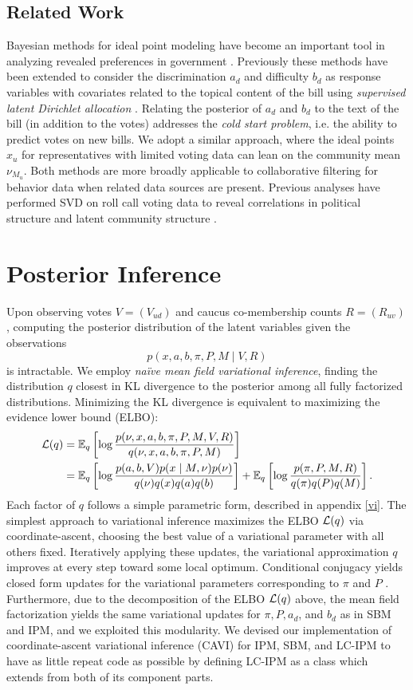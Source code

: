\documentclass{article}
\begin{document}
\subsection{Related Work}

Bayesian methods for ideal point modeling have become an important tool in analyzing revealed preferences in government \cite{Clinton2004}. Previously these methods have been extended to consider the discrimination $a_d$ and difficulty $b_d$ as response variables with covariates related to the topical content of the bill using {\sl supervised latent Dirichlet allocation} \cite{Gerrish2011}. Relating the posterior of $a_d$ and $b_d$ to the text of the bill (in addition to the votes) addresses the {\sl cold start problem}, i.e. the ability to predict votes on new bills. We adopt a similar approach, where the ideal points $x_u$ for representatives with limited voting data can lean on the community mean $\nu_{M_u}$. Both methods are more broadly applicable to collaborative filtering for behavior data when related data sources are present. Previous analyses have performed SVD on roll call voting data to reveal correlations in political structure and latent community structure \cite{Porter2007}.

\section{Posterior Inference}
\label{inference}

Upon observing votes $V = (V_{ud})$ and caucus co-membership counts $R = (R_{uv})$, computing the posterior distribution of the latent variables given the observations
$$
p(x, a, b, \pi, P, M \mid V, R)
$$
 is intractable. We employ {\sl na\"ive mean field variational inference}, finding the distribution $q$ closest in KL divergence to the posterior among all fully factorized distributions. Minimizing the KL divergence is equivalent to maximizing the evidence lower bound (ELBO):
\begin{align*}
\mathcal{L}(q)
&= \mathbb{E}_q\left[\log \frac{p(\nu, x, a, b, \pi, P, M, V, R)}{q(\nu, x, a, b, \pi, P, M)}\right] \\
&= \mathbb{E}_q\left[\log \frac{p(a, b, V)p(x\mid M, \nu)p(\nu)}{q(\nu)q(x)q(a)q(b)}\right]
+ \mathbb{E}_q\left[\log \frac{p(\pi, P, M, R)}{q(\pi)q(P)q(M)}\right].
\end{align*}
Each factor of $q$ follows a simple parametric form, described in appendix \ref{vi}. The simplest approach to variational inference maximizes the ELBO $\mathcal{L}(q)$ via coordinate-ascent, choosing the best value of a variational parameter with all others fixed. Iteratively applying these updates, the variational approximation $q$ improves at every step toward some local optimum. Conditional conjugacy yields closed form updates for the variational parameters corresponding to $\pi$ and $P$ \cite{Blei2016}. Furthermore, due to the decomposition of the ELBO $\mathcal{L}(q)$ above, the mean field factorization yields the same variational updates for $\pi, P, a_d$, and $b_d$ as in SBM and IPM, and we exploited this modularity. We devised our implementation of coordinate-ascent variational inference (CAVI) for IPM, SBM, and LC-IPM to have as little repeat code as possible by defining LC-IPM as a class which extends from both of its component parts. 
\end{document}
